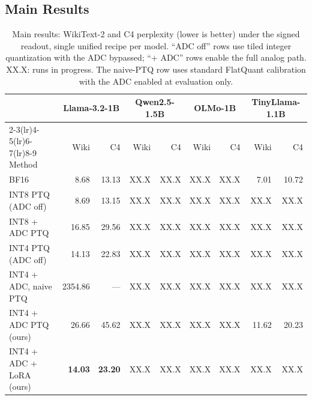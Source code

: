 \documentclass[letterpaper]{article} %
\theoremstyle{plain}
\newcommand{\phnum}{XX.X}
\begin{document}
\subsection{Main Results}

\begin{table}[t]
\centering
\small
\setlength{\tabcolsep}{5pt}
\begin{tabular}{@{}l rr rr rr rr@{}}
\toprule
& \multicolumn{2}{c}{Llama-3.2-1B} & \multicolumn{2}{c}{Qwen2.5-1.5B} & \multicolumn{2}{c}{OLMo-1B} & \multicolumn{2}{c}{TinyLlama-1.1B} \\
\cmidrule(lr){2-3}\cmidrule(lr){4-5}\cmidrule(lr){6-7}\cmidrule(lr){8-9}
Method & Wiki & C4 & Wiki & C4 & Wiki & C4 & Wiki & C4 \\
\midrule
BF16                        & 8.68    & 13.13 & \phnum & \phnum & \phnum & \phnum & 7.01 & 10.72 \\ %
INT8 PTQ (ADC off)          & 8.69    & 13.15 & \phnum & \phnum & \phnum & \phnum & \phnum & \phnum \\ %
INT8 + ADC PTQ              & 16.85   & 29.56 & \phnum & \phnum & \phnum & \phnum & \phnum & \phnum \\ %
INT4 PTQ (ADC off)          & 14.13   & 22.83 & \phnum & \phnum & \phnum & \phnum & \phnum & \phnum \\ %
INT4 + ADC, naive PTQ       & 2354.86 & ---   & \phnum & \phnum & \phnum & \phnum & \phnum & \phnum \\ %
INT4 + ADC PTQ (ours)       & 26.66   & 45.62 & \phnum & \phnum & \phnum & \phnum & 11.62 & 20.23 \\ %
INT4 + ADC + LoRA (ours)    & \textbf{14.03} & \textbf{23.20} & \phnum & \phnum & \phnum & \phnum & \phnum & \phnum \\ %
\bottomrule
\end{tabular}
\caption{Main results: WikiText-2 and C4 perplexity (lower is better) under the signed readout, single unified recipe per model. ``ADC off'' rows use tiled integer quantization with the ADC bypassed; ``+ ADC'' rows enable the full analog path. \phnum{}: runs in progress. The naive-PTQ row uses standard FlatQuant calibration with the ADC enabled at evaluation only.}
\label{tab:main}
\end{table}
\end{document}
